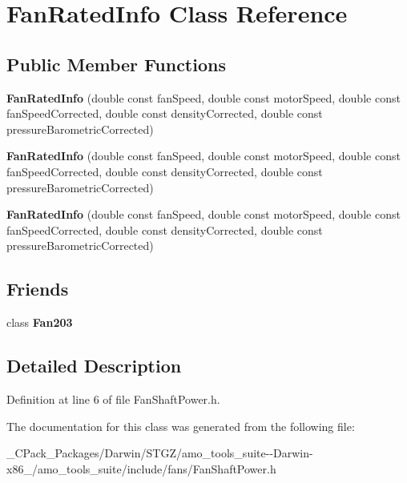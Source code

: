\hypertarget{class_fan_rated_info}{}\section{Fan\+Rated\+Info Class Reference}
\label{class_fan_rated_info}
\subsection*{Public Member Functions}
\begin{DoxyCompactItemize}
\item 
\mbox{\label{class_fan_rated_info_aa76c95537bd1a0cd0159a8d45df76f18}} 
{\bfseries Fan\+Rated\+Info} (double const fan\+Speed, double const motor\+Speed, double const fan\+Speed\+Corrected, double const density\+Corrected, double const pressure\+Barometric\+Corrected)
\item 
\mbox{\label{class_fan_rated_info_aa76c95537bd1a0cd0159a8d45df76f18}} 
{\bfseries Fan\+Rated\+Info} (double const fan\+Speed, double const motor\+Speed, double const fan\+Speed\+Corrected, double const density\+Corrected, double const pressure\+Barometric\+Corrected)
\item 
\mbox{\label{class_fan_rated_info_aa76c95537bd1a0cd0159a8d45df76f18}} 
{\bfseries Fan\+Rated\+Info} (double const fan\+Speed, double const motor\+Speed, double const fan\+Speed\+Corrected, double const density\+Corrected, double const pressure\+Barometric\+Corrected)
\end{DoxyCompactItemize}
\subsection*{Friends}
\begin{DoxyCompactItemize}
\item 
\mbox{\label{class_fan_rated_info_ad537df0087a4a6f474dc9d50579cc33d}} 
class {\bfseries Fan203}
\end{DoxyCompactItemize}


\subsection{Detailed Description}


Definition at line 6 of file Fan\+Shaft\+Power.\+h.



The documentation for this class was generated from the following file\+:\begin{DoxyCompactItemize}
\item 
\+\_\+\+C\+Pack\+\_\+\+Packages/\+Darwin/\+S\+T\+G\+Z/amo\+\_\+tools\+\_\+suite-\/-\/\+Darwin-\/x86\+\_/amo\+\_\+tools\+\_\+suite/include/fans/Fan\+Shaft\+Power.\+h\end{DoxyCompactItemize}
